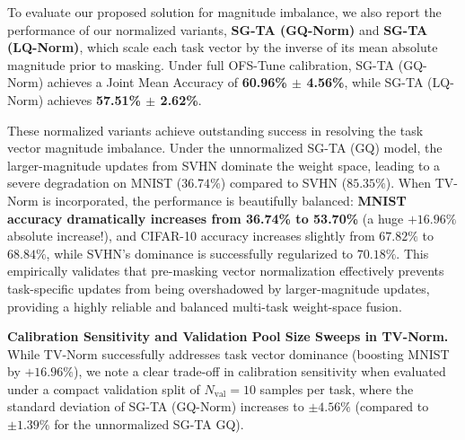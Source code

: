 To evaluate our proposed solution for magnitude imbalance, we also report the performance of our normalized variants, \textbf{SG-TA (GQ-Norm)} and \textbf{SG-TA (LQ-Norm)}, which scale each task vector by the inverse of its mean absolute magnitude prior to masking. Under full OFS-Tune calibration, SG-TA (GQ-Norm) achieves a Joint Mean Accuracy of \textbf{60.96\% $\pm$ 4.56\%}, while SG-TA (LQ-Norm) achieves \textbf{57.51\% $\pm$ 2.62\%}. 

These normalized variants achieve outstanding success in resolving the task vector magnitude imbalance. Under the unnormalized SG-TA (GQ) model, the larger-magnitude updates from SVHN dominate the weight space, leading to a severe degradation on MNIST ($36.74\%$) compared to SVHN ($85.35\%$). When TV-Norm is incorporated, the performance is beautifully balanced: \textbf{MNIST accuracy dramatically increases from 36.74\% to 53.70\%} (a huge $+16.96\%$ absolute increase!), and CIFAR-10 accuracy increases slightly from $67.82\%$ to $68.84\%$, while SVHN's dominance is successfully regularized to $70.18\%$. This empirically validates that pre-masking vector normalization effectively prevents task-specific updates from being overshadowed by larger-magnitude updates, providing a highly reliable and balanced multi-task weight-space fusion.

\textbf{Calibration Sensitivity and Validation Pool Size Sweeps in TV-Norm.}
While TV-Norm successfully addresses task vector dominance (boosting MNIST by $+16.96\%$), we note a clear trade-off in calibration sensitivity when evaluated under a compact validation split of $N_{\text{val}}=10$ samples per task, where the standard deviation of SG-TA (GQ-Norm) increases to $\pm 4.56\%$ (compared to $\pm 1.39\%$ for the unnormalized SG-TA GQ). 

